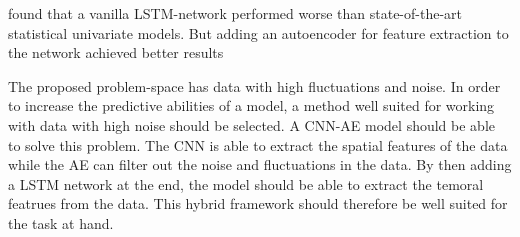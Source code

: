\cite{Laptev} found that a vanilla LSTM-network performed worse than
state-of-the-art statistical univariate models. But adding
an autoencoder for feature extraction to the network achieved better results




The proposed problem-space has data with high fluctuations and noise.
In order to increase the predictive abilities of a model, a method well suited for working with data with high noise should be selected.
A CNN-AE model should be able to solve this problem.
The CNN is able to extract the spatial features of the data while the AE can filter out the noise and fluctuations in the data.
By then adding a LSTM network at the end, the model should be able to extract the temoral featrues from the data.
This hybrid framework should therefore be well suited for the task at hand.




